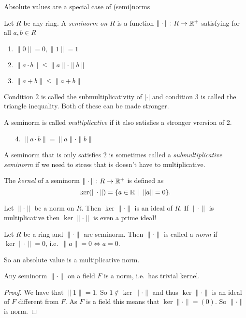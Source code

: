 Absolute values are a special case of (semi)norms
\begin{definition}
	Let $R$ be any ring. A \emph{seminorm on $R$} is a function $\|\cdot \|: R \to \mathbb{R}^{+}$ satisfying for all $a, b \in R$ 
	\begin{enumerate}
		\item $\|0\| = 0, \|1\| = 1$
		\item $\|a \cdot b\| \le \|a \| \cdot \|b\|$ 
		\item $\|a + b\| \le \|a + b\|$ 
	\end{enumerate}
	Condition $2$ is called the submultiplicativity of $|\cdot |$ and condition 3 is called the triangle inequality. Both of these can be made stronger. 

	A seminorm is called \emph{multiplicative} if it also satisfies a stronger vrersion of 2. 
	\begin{enumerate}
		\item [4.]  $\|a \cdot  b\| = \|a \| \cdot \|b\|$
	\end{enumerate}
	A seminorm that is only satisfies $2$ is sometimes called a \emph{submultiplicative seminorm} if we need to stress that is doesn't have to multiplicative. 
\end{definition}

\begin{definition}
	The \emph{kernel} of a seminorm $\|\cdot \|: R \to \mathbb{R}^{+}$ is defined as \[
		\ker(\|\cdot \|) = \{a \in \R \st \|a\| = 0\} 
	.\] 
\end{definition}
\begin{remark}\label{rem:ker_norm_ideal}
	Let $\|\cdot \|$ be a norm on $R$. Then $\ker \|\cdot \|$ is an ideal of $R$. If $\|\cdot \|$ is multiplicative then $\ker \|\cdot \|$ is even a prime ideal!
\end{remark}

\begin{definition}
	Let $R$ be a ring and $\|\cdot \|$ are seminorm. 
	Then $\|\cdot \|$ is called a \emph{norm} if $\ker \|\cdot \| = 0$, i.e.\ $\|a\| = 0 \iff a = 0$. 
\end{definition}

So an absolute value is a multiplicative norm. 

\begin{lemma}
	Any seminorm $\|\cdot \|$ on a field $F$ is a norm, i.e.\ has trivial kernel. 
\end{lemma}
\begin{proof}
	We have that $\|1\| = 1$. So $1 \not\in \ker \|\cdot \|$ and thus $\ker \|\cdot \|$ is an ideal of $F$ different from $F$. 
	As $F$ is a field this means that $\ker \|\cdot \| = (0)$. So $\|\cdot \|$ is norm. 
\end{proof}

